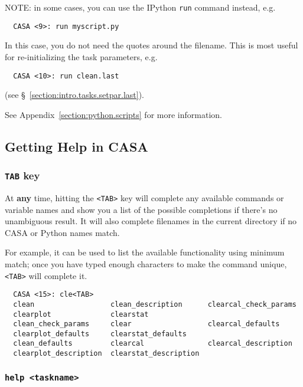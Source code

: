 NOTE: in some cases, you can use the IPython {\tt run} command
instead, e.g.
\small
\begin{verbatim}
  CASA <9>: run myscript.py
\end{verbatim}
\normalsize
In this case, you do not need the quotes around the filename.
This is most useful for re-initializing the task parameters,
e.g.
\small
\begin{verbatim}
  CASA <10>: run clean.last
\end{verbatim}
\normalsize
(see \S~\ref{section:intro.tasks.setpar.last}).

See Appendix~\ref{section:python.scripts} for more information.

\subsection{Getting Help in CASA}
\label{section:intro.basics.help}

\subsubsection{{\tt TAB} key}
\label{section:intro.basics.help.tab}

At {\bf any} time, hitting the {\tt <TAB>} key will complete any
available commands or
variable names and show you a list of the possible completions if
there's no unambiguous result. It will also complete filenames in the
current directory if no CASA or Python names match.

For example, it can be used to list the available functionality using
minimum match; once you have typed enough characters to make the
command unique, {\tt <TAB>} will complete it. 
\small
\begin{verbatim}
  CASA <15>: cle<TAB>
  clean                  clean_description      clearcal_check_params
  clearplot              clearstat
  clean_check_params     clear                  clearcal_defaults
  clearplot_defaults     clearstat_defaults
  clean_defaults         clearcal               clearcal_description
  clearplot_description  clearstat_description
\end{verbatim}
\normalsize

\subsubsection{{\tt help <taskname>}}
\label{section:intro.basics.help.help}

